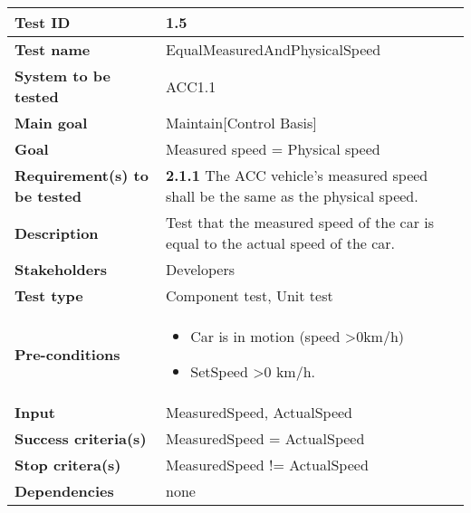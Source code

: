 	\begin{table}[H]
		\begin{tabular}{| p{4cm} | p{10cm} |}
		\hline
		\rowcolor{gray}
			\hline
			{\bf Test ID} & 1.5 \\ \hline
			{\bf Test name} & EqualMeasuredAndPhysicalSpeed \\ \hline
			{\bf System to be tested} & ACC1.1\\ \hline
			{\bf Main goal} & Maintain[Control Basis] \\ \hline
			{\bf Goal} & Measured speed = Physical speed \\ \hline
			{\bf Requirement(s) to be tested} & {\bf 2.1.1} The ACC vehicle’s measured 
			speed shall be the same as the physical speed.\\ \hline
			{\bf Description} & Test that the measured speed of the car is equal to 
			the actual speed of the car.\\ \hline
			{\bf Stakeholders} & Developers \\ \hline
			{\bf Test type} &  Component test, Unit test\\ \hline
			{\bf Pre-conditions} & 
				\begin{itemize}
					\item Car is in motion (speed \textgreater 0km/h)
					\item SetSpeed \textgreater 0 km/h.
				\end{itemize}\\ \hline
			{\bf Input} & MeasuredSpeed, ActualSpeed \\ \hline
			{\bf Success criteria(s)}&  MeasuredSpeed = ActualSpeed \\ \hline
			{\bf Stop critera(s)} &  MeasuredSpeed != ActualSpeed\\ \hline
			{\bf Dependencies} & none \\ \hline
		\end{tabular}
	\end{table}

